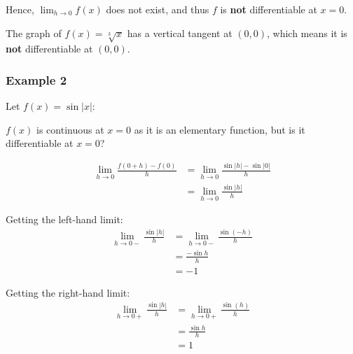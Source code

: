 \documentclass[11pt]{article}
\begin{document}
Hence, \(\lim_{h \rightarrow 0} f(x)\) does not exist, and thus \(f\) is \textbf{not} differentiable at \(x = 0\).


\begin{center}
\end{center}

The graph of \(f(x) = \sqrt[3]{x}\) has a vertical tangent at \((0, 0)\), which means it is \textbf{not} differentiable at \((0, 0)\).

\newpage
\subsubsection{Example 2}
\label{sec:org9ab06cf}
Let \(f(x) = \sin |x|\):


\(f(x)\) is continuous at \(x = 0\) as it is an elementary function, but is it differentiable at \(x = 0\)?

\begin{align*}
\lim_{h \rightarrow 0} \frac{f(0 + h) - f(0)}{h} &= \lim_{h \rightarrow 0} \frac{\sin |h| - \sin |0|}{h} \\
&= \lim_{h \rightarrow 0} \frac{\sin |h|}{h}
\end{align*}

Getting the left-hand limit:
\begin{align*}
\lim_{h \rightarrow 0-} \frac{\sin |h|}{h} &= \lim_{h \rightarrow 0-} \frac{\sin (-h)}{h} \\
&= \frac{- \sin h}{h} \\
&= -1
\end{align*}

Getting the right-hand limit:
\begin{align*}
\lim_{h \rightarrow 0+} \frac{\sin |h|}{h} &= \lim_{h \rightarrow 0+} \frac{\sin (h)}{h} \\
&= \frac{\sin h}{h} \\
&= 1
\end{align*}

\newpage

\begin{center}
\end{center}
\end{document}
